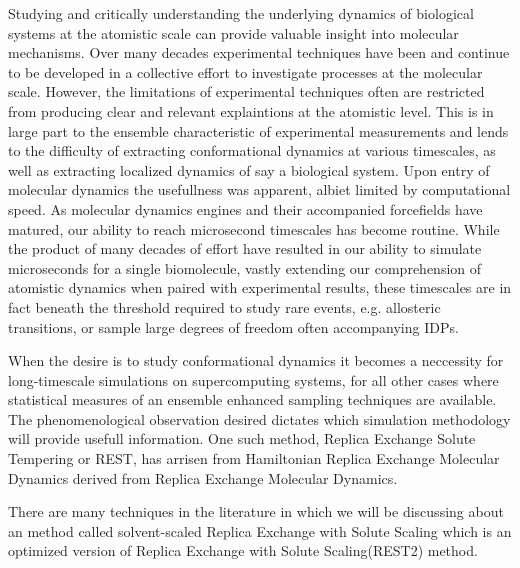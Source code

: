 Studying and critically understanding the underlying dynamics of biological systems at the atomistic scale can provide valuable insight into molecular mechanisms. 
Over many decades experimental techniques have been and continue to be developed in a collective effort to investigate processes at the molecular scale.
However, the limitations of experimental techniques often are restricted from producing clear and relevant explaintions at the atomistic level. 
This is in large part to the ensemble characteristic of experimental measurements and lends to the difficulty of extracting conformational dynamics at various timescales, as well as extracting localized dynamics of say a biological system. 
Upon entry of molecular dynamics the usefullness was apparent, albiet limited by computational speed. 
As molecular dynamics engines\cite{Weiner1981,gotz2012,salomon-ferrer2013,Brooks1983,Brooks2009,VanDerSpoel2005} and their accompanied forcefields\cite{Huang2016,Ploetz2021,Cornell1995,lindorff-larsen2010,Robustelli2018,Jakobsen2015,Piana2020} have matured, our ability to reach microsecond timescales has become routine. 
While the product of many decades of effort have resulted in our ability to simulate microseconds for a single biomolecule, vastly extending our comprehension of atomistic dynamics when paired with experimental results, these timescales are in fact beneath the threshold required to study rare events, e.g. allosteric transitions, or sample large degrees of freedom often accompanying IDPs. 

When the desire is to study conformational dynamics it becomes a neccessity for long-timescale simulations on supercomputing systems\cite{Shaw2009,Shaw2014}, for all other cases where statistical measures of an ensemble enhanced sampling techniques are available\cite{Lee2016,Wang2011,Qi2018,Vitalis2009,Zhang2023,Ray2023,Prakash2018}. 
The phenomenological observation desired dictates which simulation methodology will provide usefull information.
One such method, Replica Exchange Solute Tempering or REST\cite{Liu2005,Wang2011,Zhang2023}, has arrisen from Hamiltonian Replica Exchange Molecular Dynamics derived from Replica Exchange Molecular Dynamics. 



There are many techniques in the literature in which we will be discussing about an method called solvent-scaled Replica Exchange with Solute Scaling which is an optimized version of Replica Exchange with Solute Scaling(REST2) method.   